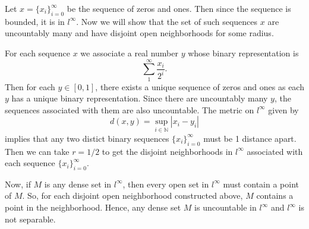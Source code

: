 
\begin{solution}
    Let $x=\{x_i\}_{i=0}^\infty$ be the sequence
    of zeros and ones. Then since the sequence
    is bounded, it is in $l^\infty$. Now we
    will show that the set of such sequences $x$
    are uncountably many and have disjoint
    open neighborhoods for some radius.

    \vspace*{3mm}
    For each sequence $x$ we associate a real
    number $y$ whose binary
    representation is
    $$\sum_1^{\infty}{\frac{x_i}{2^i}}.$$
    Then for each $y\in [0,1]$, there exists
    a unique sequence of zeros and ones as each
    $y$ has a unique binary representation. Since
    there are uncountably many $y$, the sequences
    associated with them are also uncountable.
    The metric on $l^\infty$ given by
    $$d(x,y)=\sup_{i\in \mathbb{N}}{|x_i-y_i|}$$
    implies that any two distict binary sequences
    $\{x_i\}_{i=0}^\infty$ must be 1 distance
    apart. Then we can take $r=1/2$ to get the
    disjoint neighborhoods in $l^\infty$
    associated with each sequence
    $\{x_i\}_{i=0}^\infty$.

    \vspace*{3mm}
    Now, if $M$ is any dense set in $l^\infty$,
    then every open set in $l^\infty$ must contain
    a point of $M$. So, for each disjoint
    open neighborhood constructed above, $M$
    contains a point in the neighborhood. Hence,
    any dense set $M$ is uncountable in $l^\infty$
    and $l^\infty$ is not separable.
\end{solution}